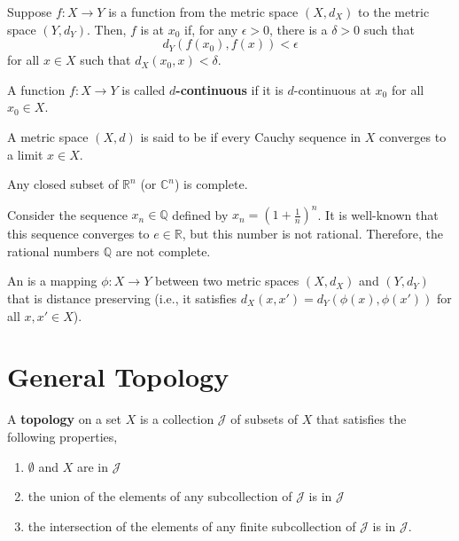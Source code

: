 \begin{definition}
Suppose $f: X \rightarrow Y$ is a function from the metric space $(X,d_X)$ to the metric space $(Y,d_Y)$.
Then, $f$ is  at $x_0$ if, for any $\epsilon> 0$, there is a $\delta >0$ such that 
\[ d_Y \left( f(x_0),f(x) \right) < \epsilon\]
for all $x\in X$ such that $d_X(x_0,x)< \delta$.
\end{definition}

\begin{definition}
A function $f : X \rightarrow Y$ is called \textbf{$d$-continuous} if it is $d$-continuous at $x_0$ for all $x_0 \in X$.
\end{definition}

\begin{definition}
A metric space $(X,d)$ is said to be  if every Cauchy sequence in $X$ converges to a limit $x \in X$.
\end{definition}

\begin{example}
Any closed subset of $\mathbb{R}^n$ (or $\mathbb{C}^n$) is complete.
\end{example}

\begin{example}
Consider the sequence $x_n \in \mathbb{Q}$ defined by $x_n = \left( 1 + \frac{1}{n} \right)^n$.
It is well-known that this sequence converges to $e\in \mathbb{R}$, but this number is not rational.
Therefore, the rational numbers $\mathbb{Q}$ are not complete.
\end{example}

\begin{definition}
An  is a mapping $\phi : X \rightarrow Y$ between two metric spaces $(X,d_X)$ and $(Y,d_Y)$ that is distance preserving (i.e., it satisfies $d_X (x,x') = d_Y \left(\phi(x),\phi(x')\right)$ for all $x,x'\in X$).
\end{definition}

\section{General Topology}

\begin{definition}
A \textbf{topology} on a set $X$ is a collection $\mathcal{J}$ of subsets of $X$ that satisfies the following properties,
\begin{enumerate}
\item $\emptyset$ and $X$ are in $\mathcal{J}$
\item the union of the elements of any subcollection of $\mathcal{J}$ is in $\mathcal{J}$
\item the intersection of the elements of any finite subcollection of $\mathcal{J}$ is in $\mathcal{J}$.
\end{enumerate}
\end{definition}

